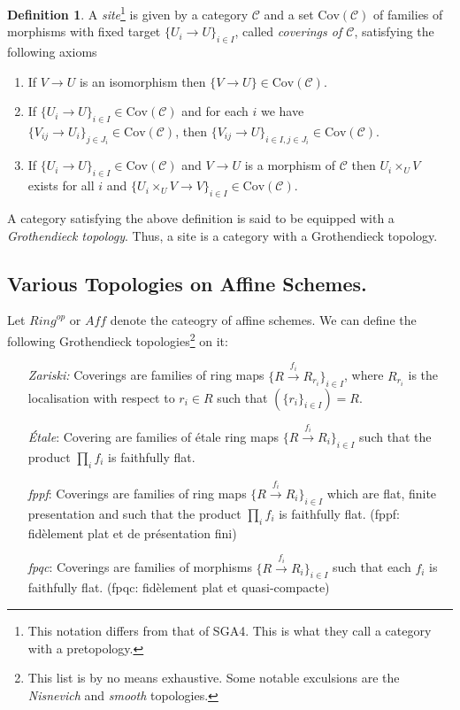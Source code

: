 \documentclass[11pt]{amsart}
\theoremstyle{definition}
\newtheorem{definition}[theorem]{Definition}
\begin{document}
\begin{definition}
	\label{definition-site}
	A {\it site}\footnote{This notation differs from that of SGA4. This is what they call a category with a pretopology.} is given by a category $\mathcal{C}$ and a set
	$\text{Cov}(\mathcal{C})$ of families of morphisms with fixed target
	$\{U_i \to U\}_{i \in I}$, called {\it coverings of $\mathcal{C}$},
	satisfying the following axioms
	\begin{enumerate}
		\item If $V \to U$ is an isomorphism then $\{V \to U\} \in
		\text{Cov}(\mathcal{C})$.
		\item If $\{U_i \to U\}_{i\in I} \in \text{Cov}(\mathcal{C})$ and for each
		$i$ we have $\{V_{ij} \to U_i\}_{j\in J_i} \in \text{Cov}(\mathcal{C})$, then
		$\{V_{ij} \to U\}_{i \in I, j\in J_i} \in \text{Cov}(\mathcal{C})$.
		\item If $\{U_i \to U\}_{i\in I}\in \text{Cov}(\mathcal{C})$
		and $V \to U$ is a morphism of $\mathcal{C}$ then $U_i \times_U V$
		exists for all $i$ and
		$\{U_i \times_U V \to V \}_{i\in I} \in \text{Cov}(\mathcal{C})$.
	\end{enumerate}
\end{definition}

A category  satisfying the above definition is said to be equipped with a \textit{Grothendieck topology}. Thus, a site is a category with a Grothendieck topology.

\subsection{Various Topologies on Affine Schemes.} Let $\mathit{Ring}^{op}$ or $\mathit{Aff}$ denote the cateogry of affine schemes. We can define the following Grothendieck topologies\footnote{This list is by no means exhaustive. Some notable exculsions are the \textit{Nisnevich} and \textit{smooth} topologies.} on it:

\begin{enumerate}
	\item[\textit{Zariski:}]  Coverings are families of ring maps $\{ R \overset{f_i}{\to} R_{r_i}\}_{i \in I}$, where $R_{r_i}$ is the localisation with respect to $r_i\in R$ such that $(\{r_i\}_{i\in I})= R$.
	\item[\textit{\'{E}tale}:] Covering are families of \'{e}tale ring maps $\{ R \overset{f_i}{\to} R_i\}_{i \in I}$ such that the product $\prod_i f_i$ is faithfully flat.
	\item[\textit{fppf}:] Coverings are families of ring maps $\{ R \overset{f_i}{\to} R_i\}_{i \in I}$ which are flat, finite presentation and such that the product $\prod_i f_i$ is faithfully flat. (fppf: fid\`{e}lement plat et de pr\'{e}sentation fini)
	\item[\textit{fpqc}:] Coverings are families of morphisms $\{ R \overset{f_i}{\to} R_i\}_{i \in I}$ such that each $f_i$ is faithfully flat. (fpqc: fid\`{e}lement plat et quasi-compacte)
\end{enumerate}
\text
\end{document}
